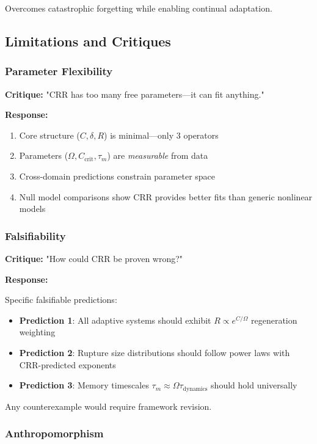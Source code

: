 \documentclass[11pt,a4paper]{article}
\theoremstyle{definition}
\theoremstyle{remark}
\begin{document}
Overcomes catastrophic forgetting while enabling continual adaptation.

\subsection{Limitations and Critiques}

\subsubsection{Parameter Flexibility}

\textbf{Critique:} "CRR has too many free parameters—it can fit anything."

\textbf{Response:}
\begin{enumerate}
\item Core structure ($C, \delta, R$) is minimal—only 3 operators
\item Parameters ($\Omega, C_{\text{crit}}, \tau_m$) are \emph{measurable} from data
\item Cross-domain predictions constrain parameter space
\item Null model comparisons show CRR provides better fits than generic nonlinear models
\end{enumerate}

\subsubsection{Falsifiability}

\textbf{Critique:} "How could CRR be proven wrong?"

\textbf{Response:}

Specific falsifiable predictions:
\begin{itemize}
\item \textbf{Prediction 1}: All adaptive systems should exhibit $R \propto e^{C/\Omega}$ regeneration weighting
\item \textbf{Prediction 2}: Rupture size distributions should follow power laws with CRR-predicted exponents
\item \textbf{Prediction 3}: Memory timescales $\tau_m \approx \Omega \tau_{\text{dynamics}}$ should hold universally
\end{itemize}

Any counterexample would require framework revision.

\subsubsection{Anthropomorphism}
\end{document}
